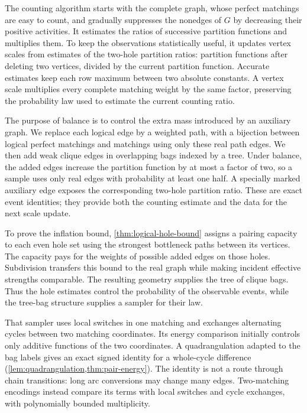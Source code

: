\documentclass[11pt]{article}
\theoremstyle{definition}
\theoremstyle{remark}
\numberwithin{equation}{section}
\begin{document}
The counting algorithm starts with the complete graph, whose perfect
matchings are easy to count, and gradually suppresses the nonedges of
$G$ by decreasing their positive activities. It estimates the ratios
of successive partition functions and multiplies them. To keep the
observations statistically useful, it updates vertex scales from
estimates of the two-hole partition ratios: partition functions after
deleting two vertices, divided by the current partition function.
Accurate estimates keep each row maximum between two absolute
constants. A vertex scale
multiplies every complete matching weight by the same factor, preserving
the probability law used to estimate the current counting ratio.

The purpose of balance is to control the extra mass introduced by an
auxiliary graph. We replace each logical edge by a weighted path, with
a bijection between logical perfect matchings and matchings using only
these real path edges. We then add weak clique edges in overlapping
bags indexed by a tree. Under balance, the added edges increase the
partition function by at most a factor of two, so a sample uses only
real edges with probability at least one half. A specially marked
auxiliary edge exposes the corresponding two-hole partition ratio.
These are exact event identities; they provide both the counting
estimate and the data for the next scale update.

To prove the inflation bound, \cref{thm:logical-hole-bound} assigns a
pairing capacity to each even hole set using the strongest bottleneck
paths between its vertices. The capacity pays for the weights of
possible added edges on those holes. Subdivision transfers this bound
to the real graph while making incident effective strengths comparable.
The resulting geometry supplies the tree of clique bags. Thus the
hole estimates control the probability of the observable events,
while the tree-bag structure supplies a sampler for their law.

That sampler uses local switches in one matching and exchanges
alternating cycles between two matching coordinates. Its energy
comparison initially controls only additive functions of the two
coordinates. A quadrangulation adapted to the bag labels gives an exact
signed identity for a whole-cycle difference
(\cref{lem:quadrangulation,thm:pair-energy}). The identity is not a
route through chain transitions: long arc conversions may change many
edges. Two-matching encodings instead compare its terms with local
switches and cycle exchanges, with polynomially bounded multiplicity.
\end{document}
